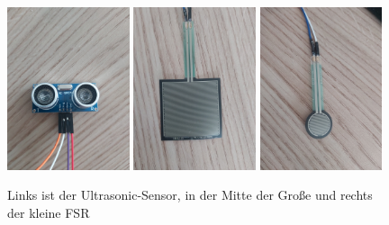 \begin{figure}[H]
	\centering
		\includegraphics[width=0.32\textwidth]{images/ult_son.jpg}
		\includegraphics[width=0.32\textwidth]{images/fsr_gross.jpg}
		\includegraphics[width=0.32\textwidth]{images/fsr_klein.jpg}
	\caption{Links ist der Ultrasonic-Sensor, in der Mitte der Große und rechts der kleine FSR}
	\label{fig:sensors}
\end{figure}

